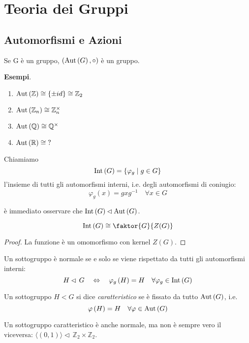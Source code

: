 \setcounter{section}{6} %
\section{Teoria dei Gruppi}
\subsection{Automorfismi e Azioni}
\begin{multicols}{2}
\begin{theorem}
	Se G è un gruppo, $ \left(\mathrm{Aut}\left( G \right), \circ\right) $ è un gruppo.
\end{theorem}

\textbf{Esempi}.
\begin{enumerate}
	\item $ \mathrm{Aut}\left( \mathbb{Z} \right) \cong \{\pm id\} \cong \mathbb{Z}_2 $
	\item $ \mathrm{Aut}\left( \mathbb{Z}_n \right) \cong \mathbb{Z}_n^\times $
	\item $ \mathrm{Aut}\left( \mathbb{Q} \right) \cong \mathbb{Q}^\times $
	\item $ \mathrm{Aut}\left( \mathbb{R} \right) \cong \; ? $
\end{enumerate} 

\begin{definition}
	Chiamiamo $$  \mathrm{Int}\left( G \right) = \{ \varphi_g \mid g \in G \}  $$ l'insieme di tutti gli automorfismi interni, i.e. degli automorfismi di coniugio: \[ \varphi_g(x) = gxg^{-1} \quad\forall x \in G \]
\end{definition}

è immediato osservare che $ \mathrm{Int}\left( G \right) \lhd \mathrm{Aut}\left( G \right) $.

\begin{prop}
	\[ \Int{G} \cong \faktor{G}{Z(G)} \]
\end{prop}
\begin{proof}
	La funzione  è un omomorfismo con kernel $ Z(G) $.
\end{proof}

\begin{remark}
	Un sottogruppo è normale se e solo se viene rispettato da tutti gli automorfismi interni:
	\[ H \lhd\, G \quad\Leftrightarrow\quad \varphi_g\left(H\right) = H \quad \forall \varphi_g \in \mathrm{Int}\left( G \right) \]
\end{remark}

\begin{definition}
	Un sottogruppo $ H < G $ si dice \emph{caratteristico} se è fissato da tutto $ \mathrm{Aut}\left( G \right) $, i.e. $$ \varphi\left(H\right) = H \quad \forall \varphi \in \mathrm{Aut}\left( G \right) $$
\end{definition}
\begin{remark}
	Un sottogruppo caratteristico è anche normale, ma non è sempre vero il viceversa: $ \langle (0, 1) \rangle \lhd\, \mathbb{Z}_2 \times \mathbb{Z}_2 $.
\end{remark}


\end{multicols}
